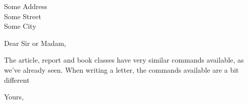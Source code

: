 \documentclass[a4papper, 12pt]{letter}
\begin{document}
\begin{letter}{Some Address\\Some Street\\Some City} %
\opening{Dear Sir or Madam,}
The article, report and book classes have very similar commands available, 
as we’ve already seen. When writing a letter, the commands available are a bit different
\closing{Yours,}
\end{letter}
\end{document}
